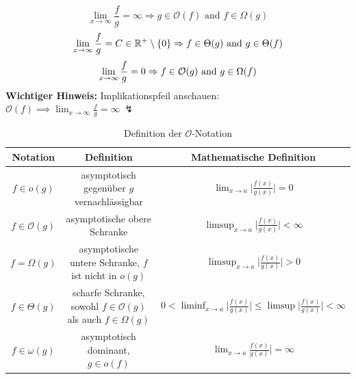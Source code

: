 \documentclass[a4paper]{article}
\begin{document}
    \begin{equation*}
    \lim_{x\to\infty}\frac fg = \infty \Rightarrow g \in \mathcal{O}(f) \text{ and } f \in \Omega(g)
    \end{equation*}
    \begin{equation*}
    \lim_{x \rightarrow \infty} \frac fg = C \in \mathbb{R}^+ \setminus \left\lbrace 0 \right\rbrace \Rightarrow f \in\Theta(g)  \text{ and } g \in\Theta(f) \\
    \end{equation*}
    \begin{equation*}
    \lim_{x \rightarrow \infty} \frac fg = 0 \Rightarrow f \in\mathcal{O}(g) \text{ and } g \in\Omega(f) \\
    \end{equation*}
    \textbf{Wichtiger Hinweis:} Implikationspfeil anschauen: $\mathcal{O}(f) \implies \lim_{x\to\infty}\frac fg = \infty \ \lightning$


    \begin{table}
        \centering
        \small
        \begin{tabular}{c|c|c}
            Notation & Definition & Mathematische Definition \\
            \hline
            $f \in o(g)$ 
            & asymptotisch gegenüber $g$ vernachlässigbar 
            & $\lim_{x\to a} \big| \frac{f(x)}{g(x)} \big| = 0 $\\
            
             $f \in \mathcal{O}(g)$
             & asymptotische obere Schranke  
             & $\limsup_{x\to a} \big| \frac{f(x)}{g(x)} \big| < \infty $ \\
             
            $f = \Omega(g)$ 
            & asymptotische untere Schranke, $f$ ist nicht in $o(g)$ 
            & 
            $\limsup_{x\to a} \big| \frac{f(x)}{g(x)} \big| > 0 $\\

            $f \in \Theta(g)$            
            & scharfe Schranke,  sowohl $f \in \mathcal{O}(g)$ als auch $f \in \Omega(g)$
            &  $0 < \liminf_{x\to a} \big| \frac{f(x)}{g(x)} \big| \leq \limsup \big| \frac{f(x)}{g(x)} \big| < \infty $ \\

            $f \in \omega(g)$
            &  asymptotisch dominant, $g \in o(f)$
            & $\lim_{x \to a}\frac{f(x)}{g(x)} \big| = \infty$ \\
        \hline
        \end{tabular}
        \caption{Definition der $\mathcal{O}$-Notation}
        \label{tab:ONotation}
    \end{table}
    
\end{document}

